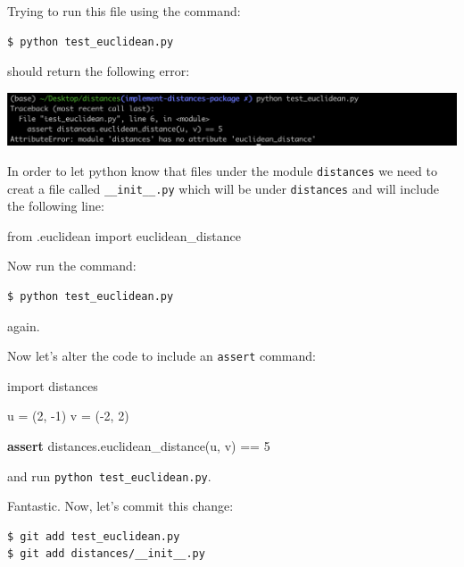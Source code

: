\documentclass[11pt]{article}
\newenvironment{Shaded}{}{}
\newcommand{\DecValTok}[1]{\textcolor[rgb]{0.25,0.63,0.44}{{#1}}}
\newcommand{\NormalTok}[1]{{#1}}
\newcommand{\ImportTok}[1]{{#1}}
\newcommand{\ControlFlowTok}[1]{\textcolor[rgb]{0.00,0.44,0.13}{\textbf{{#1}}}}
\newcommand{\OperatorTok}[1]{\textcolor[rgb]{0.40,0.40,0.40}{{#1}}}
\begin{document}
Trying to run this file using the command:

\begin{verbatim}
$ python test_euclidean.py
\end{verbatim}

should return the following error:

\includegraphics{static/running_test_error.png}

In order to let python know that files under the module
\texttt{distances} we need to creat a file called
\texttt{\_\_init\_\_.py} which will be under \texttt{distances} and will
include the following line:

\begin{Shaded}
\begin{Highlighting}[]
\ImportTok{from}\NormalTok{ .euclidean }\ImportTok{import}\NormalTok{ euclidean\_distance}
\end{Highlighting}
\end{Shaded}

Now run the command:

\begin{verbatim}
$ python test_euclidean.py
\end{verbatim}

again.

Now let's alter the code to include an \texttt{assert} command:

\begin{Shaded}
\begin{Highlighting}[]
\ImportTok{import}\NormalTok{ distances}

\NormalTok{u }\OperatorTok{=}\NormalTok{ (}\DecValTok{2}\NormalTok{, }\OperatorTok{{-}}\DecValTok{1}\NormalTok{)}
\NormalTok{v }\OperatorTok{=}\NormalTok{ (}\OperatorTok{{-}}\DecValTok{2}\NormalTok{, }\DecValTok{2}\NormalTok{)}

\ControlFlowTok{assert}\NormalTok{ distances.euclidean\_distance(u, v) }\OperatorTok{==} \DecValTok{5}
\end{Highlighting}
\end{Shaded}

and run \texttt{python\ test\_euclidean.py}.

Fantastic. Now, let's commit this change:

\begin{verbatim}
$ git add test_euclidean.py
$ git add distances/__init__.py
\end{verbatim}
\end{document}
